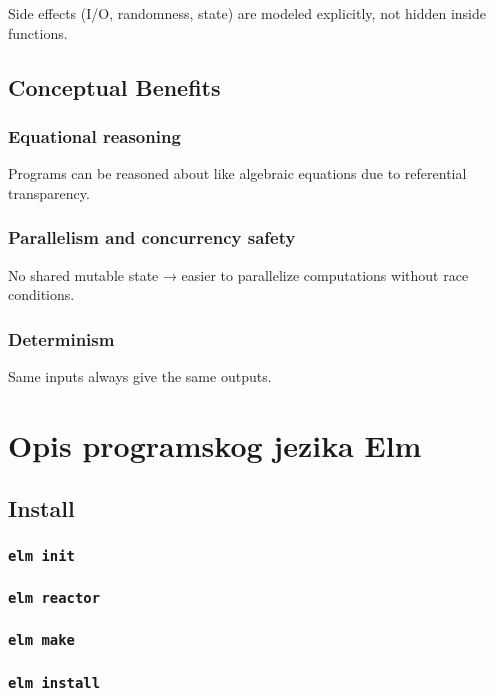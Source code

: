 \documentclass{viser-thesis}
\begin{document}
Side effects (I/O, randomness, state) are modeled explicitly, not hidden inside functions.

\newpage

\subsection{Conceptual Benefits}

\subsubsection{Equational reasoning}

Programs can be reasoned about like algebraic equations due to referential transparency.

\subsubsection{Parallelism and concurrency safety}

No shared mutable state → easier to parallelize computations without race conditions.

\subsubsection{Determinism}

Same inputs always give the same outputs.

\newpage

\section{Opis programskog jezika Elm}

\subsection{Install}

\subsubsection{\texttt{elm init}}
\subsubsection{\texttt{elm reactor}}
\subsubsection{\texttt{elm make}}
\subsubsection{\texttt{elm install}}
\end{document}
